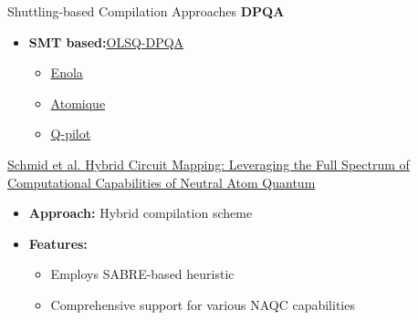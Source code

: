 \begin{frame}{Shuttling-based Compilation Approaches}
    \textbf{DPQA}
    \begin{itemize}
        \item \textbf{SMT based:}\href{http://arxiv.org/abs/2401.13807}{OLSQ-DPQA}
        \begin{itemize}
            \item \href{http://arxiv.org/abs/2405.15095}{Enola}
            \item \href{http://arxiv.org/abs/2311.15123}{Atomique}
            \item \href{https://arxiv.org/abs/2311.16190}{Q-pilot}
        \end{itemize}
    \end{itemize}

    \href{http://arxiv.org/abs/2311.14164}{Schmid et al. \tiny{Hybrid Circuit Mapping: Leveraging the Full Spectrum of Computational Capabilities of Neutral Atom Quantum }}
    \begin{itemize}
        \item \textbf{Approach:} Hybrid compilation scheme
        \item \textbf{Features:}
            \begin{itemize}
                \item Employs SABRE-based heuristic
                \item Comprehensive support for various NAQC capabilities
            \end{itemize}
    \end{itemize}
\end{frame}

